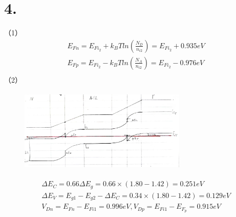 \documentclass[UTF8]{ctexart}
\begin{document}
\section*{4.}
（1）
\begin{equation*}
    \begin{aligned}
        & E_{Fn}=E_{Fi_2}+k_BTln(\frac{N_D}{n_{i2}})=E_{Fi_2}+0.935eV\\
        & E_{Fp}=E_{Fi_2}-k_BTln(\frac{N_A}{n_{i2}})=E_{Fi_2}-0.976eV\\ 
    \end{aligned}
\end{equation*}
（2）
\begin{figure}[H]
    \centering
    \includegraphics[width=8cm,height=4cm]{ans-4-2.jpg}
    \caption*{}
\end{figure}
\begin{equation*}
    \begin{aligned}
        & \Delta E_C=0.66\Delta E_g=0.66\times(1.80-1.42)=0.251eV\\
        & \Delta E_V=E_{g1}-E_{g2}-\Delta E_C=0.34\times(1.80-1.42)=0.129eV\\
        & V_{Dn} = E_{Fn} - E_{Fi1} = 0.996eV, V_{Dp} = E_{Fi1} - E_{F_p} = 0.915eV\\
    \end{aligned}
\end{equation*}
\end{document}
